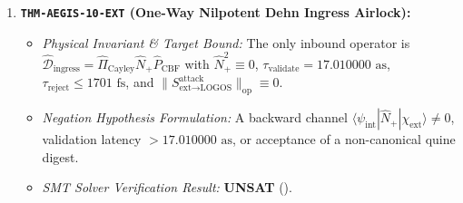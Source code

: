 \documentclass[11pt,onecolumn]{article}
\begin{document}
\begin{enumerate}
    \item \textbf{\texttt{THM-AEGIS-10-EXT} (One-Way Nilpotent Dehn Ingress Airlock):}
    \begin{itemize}
        \item \emph{Physical Invariant \& Target Bound:} The only inbound operator is $\hat{\mathcal D}_{\text{ingress}}=\hat{\Pi}_{\text{Cayley}}\hat N_+\hat P_{\text{CBF}}$ with $\hat N_+^2\equiv0$, $\tau_{\text{validate}}=17.010000\text{ as}$, $\tau_{\text{reject}}\le1701\text{ fs}$, and $\|S_{\text{ext}\to\text{LOGOS}}^{\text{attack}}\|_{\text{op}}\equiv0$.
        \item \emph{Negation Hypothesis Formulation:} A backward channel $\langle\psi_{\text{int}}|\hat N_+|\chi_{\text{ext}}\rangle\neq0$, validation latency $>17.010000\text{ as}$, or acceptance of a non-canonical quine digest.
        \item \emph{SMT Solver Verification Result:} \textbf{UNSAT} ().
    \end{itemize}


\end{enumerate}
\end{document}
